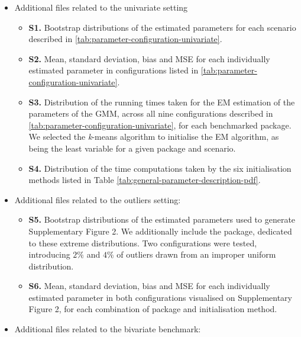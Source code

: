 \begin{itemize}
\item
  Additional files related to the univariate setting

  \begin{itemize}
  \tightlist
  \item
    \textbf{S1.} Bootstrap distributions of the estimated parameters for each
    scenario described in \ref{tab:parameter-configuration-univariate}.
  \item
    \textbf{S2.} Mean, standard deviation, bias and MSE for each individually
    estimated parameter in configurations listed in \ref{tab:parameter-configuration-univariate}.
  \item
    \textbf{S3.} Distribution of the running times taken for the EM estimation of the parameters of the GMM, across all nine configurations described in \ref{tab:parameter-configuration-univariate}, for each benchmarked package. We selected the \emph{k}-means algorithm to initialise the EM algorithm, as being the least variable for a given package and scenario.
  \item
    \textbf{S4.} Distribution of the time computations taken by the six initialisation methods listed in Table \ref{tab:general-parameter-description-pdf}.
  \end{itemize}
\item
  Additional files related to the outliers setting:

  \begin{itemize}
  \tightlist
  \item
    \textbf{S5.} Bootstrap distributions of the estimated parameters used to
    generate Supplementary Figure 2. We additionally include the  package, dedicated to these extreme distributions. Two configurations were tested, introducing \(2 \%\) and \(4 \%\) of outliers drawn from an improper uniform distribution.
  \item
    \textbf{S6.} Mean, standard deviation, bias and MSE for each individually
    estimated parameter in both configurations visualised on Supplementary Figure 2, for each combination of package and
    initialisation method.
  \end{itemize}
\item
  Additional files related to the bivariate benchmark:


\end{itemize}

